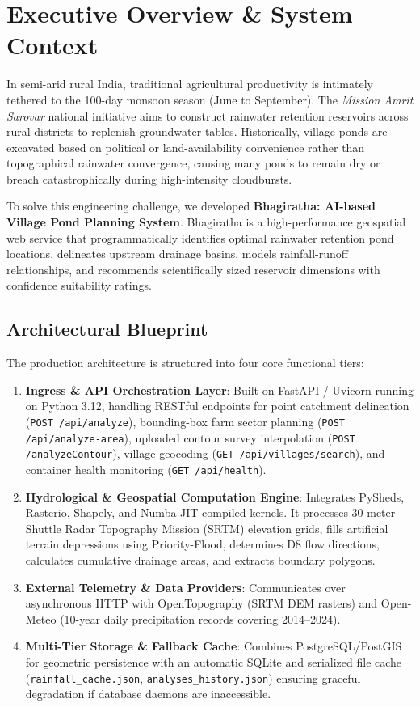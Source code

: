\documentclass[11pt,a4paper]{article}
\begin{document}
\section{Executive Overview \& System Context}
\label{sec:overview}

In semi-arid rural India, traditional agricultural productivity is intimately tethered to the 100-day monsoon season (June to September). The \textit{Mission Amrit Sarovar} national initiative aims to construct rainwater retention reservoirs across rural districts to replenish groundwater tables. Historically, village ponds are excavated based on political or land-availability convenience rather than topographical rainwater convergence, causing many ponds to remain dry or breach catastrophically during high-intensity cloudbursts.

To solve this engineering challenge, we developed \textbf{Bhagiratha: AI-based Village Pond Planning System}. Bhagiratha is a high-performance geospatial web service that programmatically identifies optimal rainwater retention pond locations, delineates upstream drainage basins, models rainfall-runoff relationships, and recommends scientifically sized reservoir dimensions with confidence suitability ratings.

\subsection{Architectural Blueprint}
The production architecture is structured into four core functional tiers:
\begin{enumerate}[leftmargin=*]
    \item \textbf{Ingress \& API Orchestration Layer}: Built on FastAPI / Uvicorn running on Python 3.12, handling RESTful endpoints for point catchment delineation (\texttt{POST /api/analyze}), bounding-box farm sector planning (\texttt{POST /api/analyze-area}), uploaded contour survey interpolation (\texttt{POST /analyzeContour}), village geocoding (\texttt{GET /api/villages/search}), and container health monitoring (\texttt{GET /api/health}).
    \item \textbf{Hydrological \& Geospatial Computation Engine}: Integrates PySheds, Rasterio, Shapely, and Numba JIT-compiled kernels. It processes 30-meter Shuttle Radar Topography Mission (SRTM) elevation grids, fills artificial terrain depressions using Priority-Flood, determines D8 flow directions, calculates cumulative drainage areas, and extracts boundary polygons.
    \item \textbf{External Telemetry \& Data Providers}: Communicates over asynchronous HTTP with OpenTopography (SRTM DEM rasters) and Open-Meteo (10-year daily precipitation records covering 2014--2024).
    \item \textbf{Multi-Tier Storage \& Fallback Cache}: Combines PostgreSQL/PostGIS for geometric persistence with an automatic SQLite and serialized file cache (\texttt{rainfall\_cache.json}, \texttt{analyses\_history.json}) ensuring graceful degradation if database daemons are inaccessible.
\end{enumerate}
\end{document}
